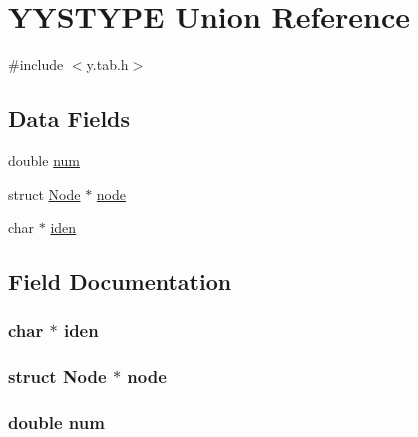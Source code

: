\hypertarget{union_y_y_s_t_y_p_e}{\section{Y\-Y\-S\-T\-Y\-P\-E Union Reference}
\label{union_y_y_s_t_y_p_e}
}


{\ttfamily \#include $<$y.\-tab.\-h$>$}

\subsection*{Data Fields}
\begin{DoxyCompactItemize}
\item 
double \hyperlink{union_y_y_s_t_y_p_e_af656038045ce6448240b3767491787da}{num}
\item 
struct \hyperlink{struct_node}{Node} $\ast$ \hyperlink{union_y_y_s_t_y_p_e_a39388179e3ce1affbf5e3e05166daf06}{node}
\item 
char $\ast$ \hyperlink{union_y_y_s_t_y_p_e_a220fe17ebcdeb374c2aea9da7bb78c3a}{iden}
\end{DoxyCompactItemize}


\subsection{Field Documentation}
\hypertarget{union_y_y_s_t_y_p_e_a220fe17ebcdeb374c2aea9da7bb78c3a}{
\subsubsection[{iden}]{\setlength{\rightskip}{0pt plus 5cm}char $\ast$ iden}}\label{union_y_y_s_t_y_p_e_a220fe17ebcdeb374c2aea9da7bb78c3a}
\hypertarget{union_y_y_s_t_y_p_e_a39388179e3ce1affbf5e3e05166daf06}{
\subsubsection[{node}]{\setlength{\rightskip}{0pt plus 5cm}struct {\bf Node} $\ast$ node}}\label{union_y_y_s_t_y_p_e_a39388179e3ce1affbf5e3e05166daf06}
\hypertarget{union_y_y_s_t_y_p_e_af656038045ce6448240b3767491787da}{
\subsubsection[{num}]{\setlength{\rightskip}{0pt plus 5cm}double num}}\label{union_y_y_s_t_y_p_e_af656038045ce6448240b3767491787da}


